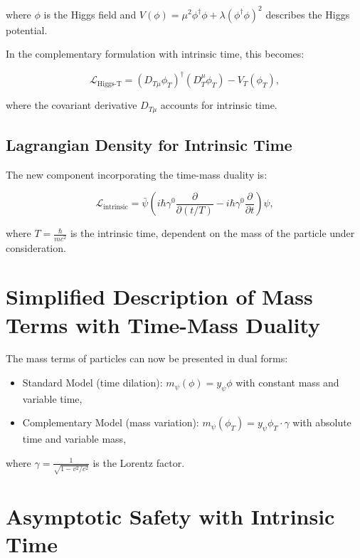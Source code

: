\documentclass{article}
\begin{document}
	where \(\phi\) is the Higgs field and \(V(\phi) = \mu^2 \phi^\dagger \phi + \lambda (\phi^\dagger \phi)^2\) describes the Higgs potential.
	
	In the complementary formulation with intrinsic time, this becomes:
	
	\begin{equation}
		\mathcal{L}_\text{Higgs-T} = (D_{T\mu} \phi_T)^\dagger (D_T^\mu \phi_T) - V_T(\phi_T),
	\end{equation}
	
	where the covariant derivative \(D_{T\mu}\) accounts for intrinsic time.
	
	\subsection{Lagrangian Density for Intrinsic Time}
	The new component incorporating the time-mass duality is:
	
	\begin{equation}
		\mathcal{L}_\text{intrinsic} = \bar{\psi}\left(i\hbar\gamma^0 \frac{\partial}{\partial (t/T)} - i\hbar\gamma^0 \frac{\partial}{\partial t}\right)\psi,
	\end{equation}
	
	where \(T = \frac{\hbar}{mc^2}\) is the intrinsic time, dependent on the mass of the particle under consideration.
	
	\section{Simplified Description of Mass Terms with Time-Mass Duality}
	
	The mass terms of particles can now be presented in dual forms:
	
	\begin{itemize}
		\item Standard Model (time dilation): \(m_\psi(\phi) = y_\psi \phi\) with constant mass and variable time,
		\item Complementary Model (mass variation): \(m_\psi(\phi_T) = y_\psi \phi_T \cdot \gamma\) with absolute time and variable mass,
	\end{itemize}
	
	where \(\gamma = \frac{1}{\sqrt{1-v^2/c^2}}\) is the Lorentz factor.
	
	\section{Asymptotic Safety with Intrinsic Time}
	
\end{document}
